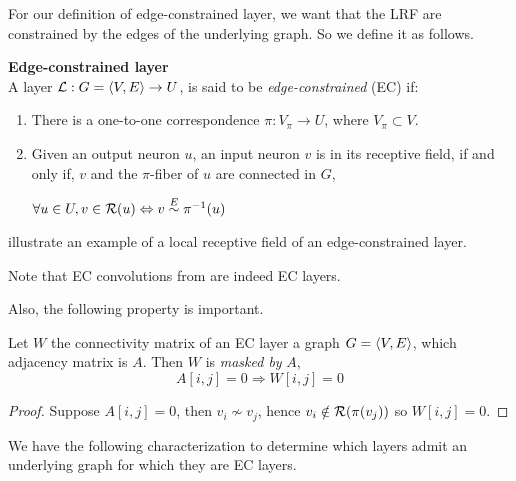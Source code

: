 For our definition of edge-constrained layer, we want that the LRF are constrained by the edges of the underlying graph. So we define it as follows.

\begin{definition}\textbf{Edge-constrained layer}\\
A layer $\mathcal{L}: G = \langle V, E \rangle \rightarrow U$, is said to be \emph{edge-constrained} (EC) if:
\begin{enumerate}
  \item There is a one-to-one correspondence $\pi: V_\pi \rightarrow U$, where $V_\pi \subset V$.
  \item Given an output neuron $u$, an input neuron $v$ is in its receptive field, if and only if, $v$ and the $\pi$-fiber of $u$ are connected in $G$,\\
  \centerline{\ie $\forall u \in U, v \in \mathcal{R}(u) \Leftrightarrow v \overset{E}\sim \pi^{-1}(u) $}
\end{enumerate}
\end{definition}

 illustrate an example of a local receptive field of an edge-constrained layer.




\begin{remark}Note that EC convolutions from  are indeed EC layers.\end{remark}

Also, the following property is important.

\begin{proposition}Let $W$ the connectivity matrix of an EC layer \wrt a graph $G = \langle V, E \rangle$, which adjacency matrix is $A$. Then $W$ is \emph{masked by} $A$, \ie
$$
A[i,j] = 0 \Rightarrow W[i,j] = 0
$$
\label{prop:aw}
\end{proposition}
\begin{proof}
Suppose $A[i,j] = 0$, then $v_i \nsim v_j$, hence $v_i \notin \mathcal{R}(\pi(v_j))$ so $W[i,j] = 0$.
\end{proof}

We have the following characterization to determine which layers admit an underlying graph for which they are EC layers.

